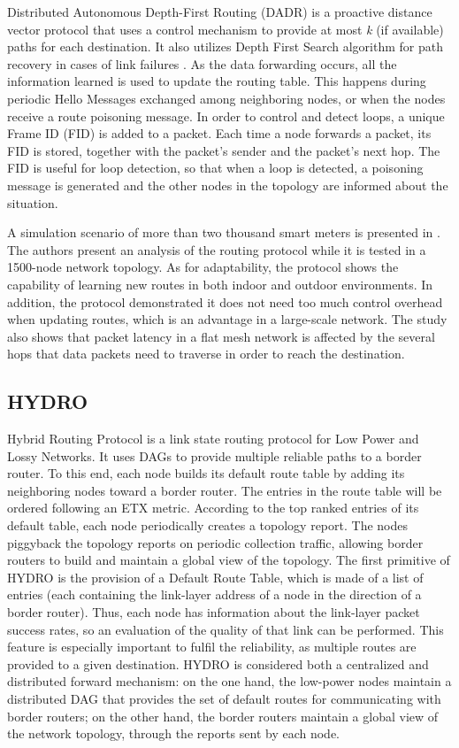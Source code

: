 \documentclass[11pt,draftclsnofoot,onecolumn]{IEEEtran}
\begin{document}
Distributed Autonomous Depth-First Routing (DADR) \cite{Iwao2009} is a proactive distance vector protocol that uses a control mechanism to provide at most \textit{k} (if available) paths for each destination. It also utilizes Depth First Search algorithm for path recovery in cases of link failures \cite{Cespedes2012}. As the data forwarding occurs, all the information learned is used to update the routing table. This happens during periodic Hello Messages exchanged among neighboring nodes, or when the nodes receive a route poisoning message. In order to control and detect loops, a unique Frame ID (FID) is added to a packet. Each time a node forwards a packet, its FID is stored, together with the packet's sender and the packet's next hop. The FID is useful for loop detection, so that when a loop is detected, a poisoning message is generated and the other nodes in the topology are informed about the situation.

A simulation scenario of more than two thousand smart meters is presented in \cite{Iwao2010}. The authors present an analysis of the routing protocol while it is tested in a 1500-node network topology. As for adaptability, the protocol shows the capability of learning new routes in both indoor and outdoor environments. In addition, the protocol demonstrated it does not need too much control overhead when updating routes, which is an advantage in a large-scale network. The study also shows that packet latency in a flat mesh network is affected by the several hops that data packets need to traverse in order to reach the destination.

\subsection{HYDRO}\label{hydro}


Hybrid Routing Protocol \cite{Dawson2010} is a link state routing protocol for Low Power and Lossy Networks. It uses DAGs to provide multiple reliable paths to a border router. To this end, each node builds its default route table by adding its neighboring nodes toward a border router. The entries in the route table will be ordered following an ETX metric. According to the top ranked entries of its default table, each node periodically creates a topology report. The nodes piggyback the topology reports on periodic collection traffic, allowing border routers to build and maintain a global view of the topology. The first primitive of HYDRO is the provision of a Default Route Table, which is made of a list of entries (each containing the link-layer address of a node in the direction of a border router). Thus, each node has information about the link-layer packet success rates, so an evaluation of the quality of that link can be performed. This feature is especially important to fulfil the reliability, as multiple routes are provided to a given destination. HYDRO is considered both a centralized and distributed forward mechanism: on the one hand, the low-power nodes maintain a distributed DAG that provides the set of default routes for communicating with border routers; on the other hand, the border routers maintain a global view of the network topology, through the reports sent by each node. 
\end{document}
